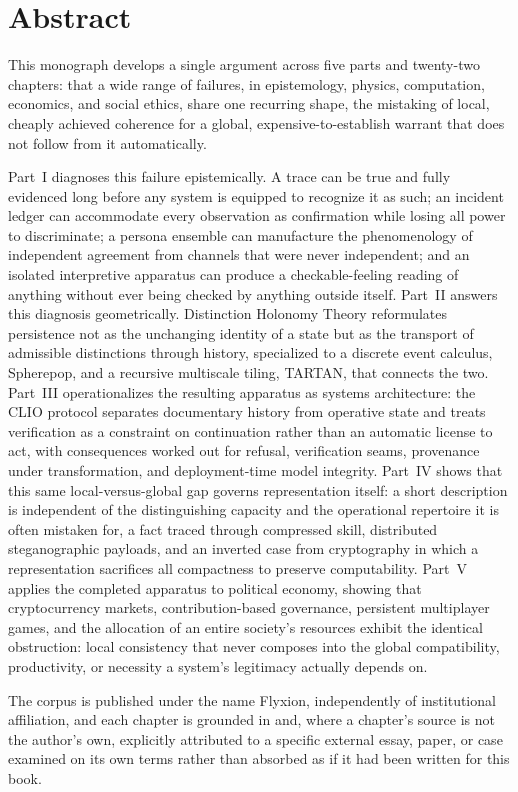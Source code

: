 \chapter*{Abstract}

This monograph develops a single argument across five parts and twenty-two chapters: that a wide range of failures, in epistemology, physics, computation, economics, and social ethics, share one recurring shape, the mistaking of local, cheaply achieved coherence for a global, expensive-to-establish warrant that does not follow from it automatically.

Part~I diagnoses this failure epistemically. A trace can be true and fully evidenced long before any system is equipped to recognize it as such; an incident ledger can accommodate every observation as confirmation while losing all power to discriminate; a persona ensemble can manufacture the phenomenology of independent agreement from channels that were never independent; and an isolated interpretive apparatus can produce a checkable-feeling reading of anything without ever being checked by anything outside itself. Part~II answers this diagnosis geometrically. Distinction Holonomy Theory reformulates persistence not as the unchanging identity of a state but as the transport of admissible distinctions through history, specialized to a discrete event calculus, Spherepop, and a recursive multiscale tiling, TARTAN, that connects the two. Part~III operationalizes the resulting apparatus as systems architecture: the CLIO protocol separates documentary history from operative state and treats verification as a constraint on continuation rather than an automatic license to act, with consequences worked out for refusal, verification seams, provenance under transformation, and deployment-time model integrity. Part~IV shows that this same local-versus-global gap governs representation itself: a short description is independent of the distinguishing capacity and the operational repertoire it is often mistaken for, a fact traced through compressed skill, distributed steganographic payloads, and an inverted case from cryptography in which a representation sacrifices all compactness to preserve computability. Part~V applies the completed apparatus to political economy, showing that cryptocurrency markets, contribution-based governance, persistent multiplayer games, and the allocation of an entire society's resources exhibit the identical obstruction: local consistency that never composes into the global compatibility, productivity, or necessity a system's legitimacy actually depends on.

The corpus is published under the name Flyxion, independently of institutional affiliation, and each chapter is grounded in and, where a chapter's source is not the author's own, explicitly attributed to a specific external essay, paper, or case examined on its own terms rather than absorbed as if it had been written for this book.
